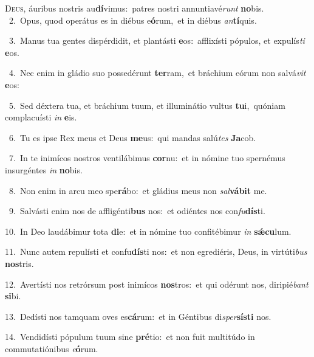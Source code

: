 \lettrine{\initial\textcolor{\initialcolor}{D}}{eus,} áuribus nostris au\-\textbf{dí}\-vimus:~\star patres nostri annuntiavé\textit{runt} \textbf{no}\-bis.\\
{\numbfont\textcolor{\numbcolor}{~2.}}~Opus, quod operátus es in diébus e\-\textbf{ó}\-rum,~\star et in diébus \textit{an}\-\textbf{tí}quis.\par
{\numbfont\textcolor{\numbcolor}{~3.}}~Manus tua gentes dispérdidit, et plantásti \textbf{e}\-os:~\star afflixísti pópulos, et expulís\textit{ti} \textbf{e}\-os.\par
{\numbfont\textcolor{\numbcolor}{~4.}}~Nec enim in gládio suo possedérunt \textbf{ter}\-ram,~\star et bráchium eórum non salvá\textit{vit} \textbf{e}\-os:\par
{\numbfont\textcolor{\numbcolor}{~5.}}~Sed déxtera tua, et bráchium tuum, et illuminátio vultus \textbf{tu}\-i,~\star quóniam complacuísti \textit{in} \textbf{e}\-is.\par
{\numbfont\textcolor{\numbcolor}{~6.}}~Tu es ipse Rex meus et Deus \textbf{me}\-us:~\star qui mandas salú\textit{tes} \textbf{Ja}\-cob.\par
{\numbfont\textcolor{\numbcolor}{~7.}}~In te inimícos nostros ventilábimus \textbf{cor}\-nu:~\star et in nómine tuo spernémus insurgéntes \textit{in} \textbf{no}\-bis.\par
{\numbfont\textcolor{\numbcolor}{~8.}}~Non enim in arcu meo spe\-\textbf{rá}\-bo:~\star et gládius meus non \textit{sal}\-\textbf{vá}\textbf{bit} me.\par
{\numbfont\textcolor{\numbcolor}{~9.}}~Salvásti enim nos de affligénti\textbf{bus} nos:~\star et odiéntes nos con\-\textit{fu}\-\textbf{dís}ti.\par
{\numbfont\textcolor{\numbcolor}{10.}}~In Deo laudábimur tota \textbf{di}\-e:~\star et in nómine tuo confitébimur \textit{in} \textbf{sǽ}\-\textbf{cu}lum.\par
{\numbfont\textcolor{\numbcolor}{11.}}~Nunc autem repulísti et confu\-\textbf{dís}\-ti nos:~\star et non egrediéris, Deus, in virtúti\textit{bus} \textbf{nos}\-tris.\par
{\numbfont\textcolor{\numbcolor}{12.}}~Avertísti nos retrórsum post inimícos \textbf{nos}\-tros:~\star et qui odérunt nos, diripié\textit{bant} \textbf{si}\-bi.\par
{\numbfont\textcolor{\numbcolor}{13.}}~Dedísti nos tamquam oves es\-\textbf{cá}\-rum:~\star et in Géntibus di\-\textit{sper}\-\textbf{sís}\textbf{ti} nos.\par
{\numbfont\textcolor{\numbcolor}{14.}}~Vendidísti pópulum tuum sine \textbf{pré}\-tio:~\star et non fuit multitúdo in commutatiónibus \textit{e}\-\textbf{ó}rum.\par
